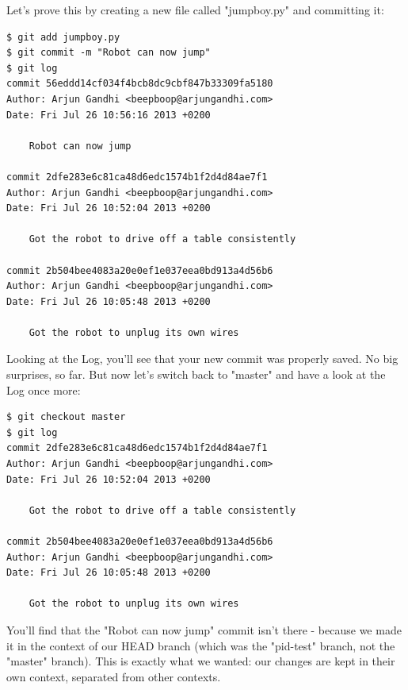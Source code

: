 \documentclass{article}
\begin{document}
Let's prove this by creating a new file called "jumpboy.py" and committing it:
\begin{lstlisting}
$ git add jumpboy.py
$ git commit -m "Robot can now jump"
$ git log
commit 56eddd14cf034f4bcb8dc9cbf847b33309fa5180
Author: Arjun Gandhi <beepboop@arjungandhi.com>
Date: Fri Jul 26 10:56:16 2013 +0200

    Robot can now jump

commit 2dfe283e6c81ca48d6edc1574b1f2d4d84ae7f1
Author: Arjun Gandhi <beepboop@arjungandhi.com>
Date: Fri Jul 26 10:52:04 2013 +0200

    Got the robot to drive off a table consistently

commit 2b504bee4083a20e0ef1e037eea0bd913a4d56b6
Author: Arjun Gandhi <beepboop@arjungandhi.com>
Date: Fri Jul 26 10:05:48 2013 +0200

    Got the robot to unplug its own wires
\end{lstlisting}
Looking at the Log, you'll see that your new commit was properly saved. No big surprises, so far. But now let's switch back to "master" and have a look at the Log once more:
\begin{lstlisting}
$ git checkout master
$ git log
commit 2dfe283e6c81ca48d6edc1574b1f2d4d84ae7f1
Author: Arjun Gandhi <beepboop@arjungandhi.com>
Date: Fri Jul 26 10:52:04 2013 +0200

    Got the robot to drive off a table consistently

commit 2b504bee4083a20e0ef1e037eea0bd913a4d56b6
Author: Arjun Gandhi <beepboop@arjungandhi.com>
Date: Fri Jul 26 10:05:48 2013 +0200

    Got the robot to unplug its own wires
\end{lstlisting}

You'll find that the "Robot can now jump" commit isn't there - because we made it in the context of our HEAD branch (which was the "pid-test" branch, not the "master" branch). This is exactly what we wanted: our changes are kept in their own context, separated from other contexts.
\end{document}
